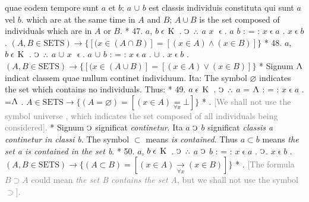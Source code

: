 \documentclass{book}
\newcommand{\C}{\mathop{\sbox0{$\displaystyle$$\reflectbox{C}$} %
\raisebox{-\height+\ht0-0.05cm}[\ht0][\dp0]{\scalebox{0.8}[0.8]{\copy0}}}\displaylimits} %
\newcommand{\pppNoSpace}{\leavevmode\lower0ex\hbox{.}\kern-0.1em\raise0.7ex\hbox{.}\kern-0.1em\lower0ex\hbox{.}} %
\newcommand{\abs}{\mathop{\rotatebox[origin=c]{180}{V}}}
\newcommand{\smallIn}{\ensuremath{\mathrel{\epsilon}}}
\newcommand{\K}{\mathop{\thinspace \text{K} \thinspace}}
\newcommand{\setOfSets}{\mathord{\text{SETS}}}
\newcommand\irrelavent[1]{\textcolor{gray}{#1}}
\newenvironment{translateTwoCol}
               { %
                 \columnratio{0.5, 0.5} \begin{paracol}{2}
                 \newcommand{\LAT}{\switchcolumn[0]*}
                 \newcommand{\ENG}{\switchcolumn[1]}
               }
               { %
                 \let\ENG\undefined
                 \let\LAT\undefined
                 \end{paracol}
               }
\begin{document}
\begin{translateTwoCol}
quae eodem tempore sunt $a$ et $b$; $a$ $\cup$ $b$ est classis individuis constituta qui sunt $a$ vel $b$.
\ENG
which are at the same time in $A$ and $B$; $A \cup B$ is the set composed of individuals which are in $A$ or $B$.
\LAT
47. \hspace{0.67cm} $a$, $b \smallIn \K$ . $\C$ $\pppNoSpace$ $a$ $x$ \smallIn . $a$ $b$ : = : $x \smallIn a$ . $x \smallIn b$
\ENG
47. \hspace{0.67cm} $(A, B \in \setOfSets) \rightarrow \{[(x \in (A \cap B)] = [(x \in A) \wedge (x \in B)]\}$
\LAT
48. \hspace{0.67cm} $a$, $b \smallIn \K$ . $\C$ $\pppNoSpace$ $a$ $\cup$ $x$ \smallIn . $a$ $\cup$ $b$ : = : $x \smallIn a$ . $\cup$ . $x \smallIn b$
\ENG
48. \hspace{0.67cm} $(A, B \in \setOfSets) \rightarrow \{[(x \in (A \cup B)] = [(x \in A) \vee (x \in B)]\}$
\LAT
\quad Signum $\abs$ indicat classem quae nullum continet individuum. Ita:
\ENG
\quad The symbol $\varnothing$ indicates the set which contains no individuals. Thus:
\LAT
49. \hspace{0.67cm} $a \smallIn \K$ . $\C$ $\pppNoSpace$ $a$ = $\abs$ : = : $x \smallIn a$ . =\scalebox{0.7}{$x$}\thinspace  $\abs$
\ENG
49. \hspace{0.67cm} $A \in \setOfSets \rightarrow \{(A= \varnothing) = [(x \in A) \underset{\forall x}= \bot]\}$ 
\LAT
{}.
\ENG
\quad \irrelavent{[We shall not use the symbol \scriptsize{universe} \normalsize, which indicates the set composed of all individuals being considered].}
\LAT
\quad Signum $\C$ significat {\emph{continetur}}. Ita $a$ $\C$ $b$ significat {\emph{classis a continetur in classi b}}.
\ENG
\quad The symbol $\subset$ means {\emph{is contained}}. Thus $a \subset b$ means {\emph{the set a is contained in the set b}}.
\LAT
50. \hspace{0.67cm} $a$, $b \smallIn \K$ . $\C$ $\pppNoSpace$ $a$ $\C$ $b$ : = : $x \smallIn a$ . $\C$\scalebox{0.7}{$x$}\thinspace . $x \smallIn b$
\ENG
50. \hspace{0.67cm} $(A, B \in \setOfSets) \rightarrow \{(A \subset B)=[(x\in A) \xrightarrow[\forall x]{} (x \in B)]\}$
\LAT
{}.
\ENG
\quad \irrelavent{[The formula $B \supset A$ could mean {\emph{the set B contains the set A}}, but we shall not use the symbol $\supset$].}

\end{translateTwoCol}
\end{document}

